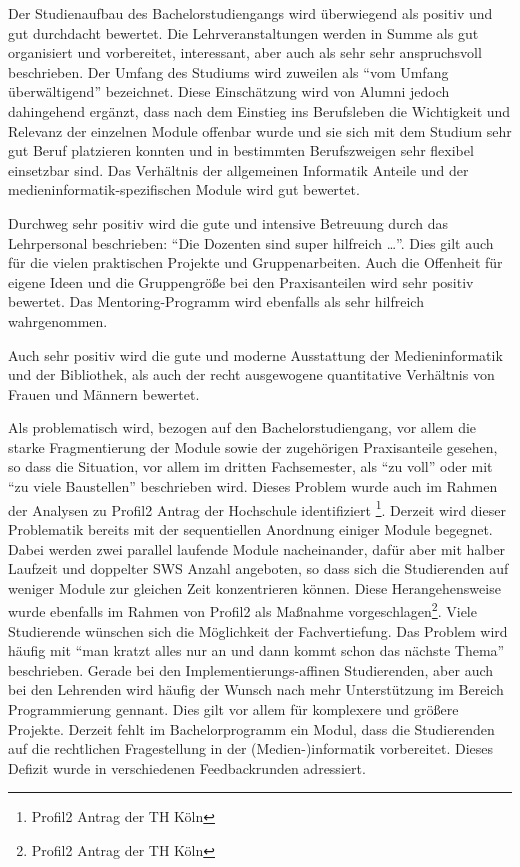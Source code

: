 Der Studienaufbau des Bachelorstudiengangs wird überwiegend als positiv
und gut durchdacht bewertet. Die Lehrveranstaltungen werden in Summe als
gut organisiert und vorbereitet, interessant, aber auch als sehr sehr
anspruchsvoll beschrieben. Der Umfang des Studiums wird zuweilen als
``vom Umfang überwältigend'' bezeichnet. Diese Einschätzung wird von
Alumni jedoch dahingehend ergänzt, dass nach dem Einstieg ins
Berufsleben die Wichtigkeit und Relevanz der einzelnen Module offenbar
wurde und sie sich mit dem Studium sehr gut Beruf platzieren konnten und
in bestimmten Berufszweigen sehr flexibel einsetzbar sind. Das
Verhältnis der allgemeinen Informatik Anteile und der
medieninformatik-spezifischen Module wird gut bewertet.

Durchweg sehr positiv wird die gute und intensive Betreuung durch das
Lehrpersonal beschrieben: ``Die Dozenten sind super hilfreich
\ldots{}''. Dies gilt auch für die vielen praktischen Projekte und
Gruppenarbeiten. Auch die Offenheit für eigene Ideen und die
Gruppengröße bei den Praxisanteilen wird sehr positiv bewertet. Das
Mentoring-Programm wird ebenfalls als sehr hilfreich wahrgenommen.

Auch sehr positiv wird die gute und moderne Ausstattung der
Medieninformatik und der Bibliothek, als auch der recht ausgewogene
quantitative Verhältnis von Frauen und Männern bewertet.

Als problematisch wird, bezogen auf den Bachelorstudiengang, vor allem
die starke Fragmentierung der Module sowie der zugehörigen Praxisanteile
gesehen, so dass die Situation, vor allem im dritten Fachsemester, als
``zu voll'' oder mit ``zu viele Baustellen'' beschrieben wird. Dieses
Problem wurde auch im Rahmen der Analysen zu Profil2 Antrag der
Hochschule identifiziert \footnote{Profil2 Antrag der TH Köln}. Derzeit
wird dieser Problematik bereits mit der sequentiellen Anordnung einiger
Module begegnet. Dabei werden zwei parallel laufende Module
nacheinander, dafür aber mit halber Laufzeit und doppelter SWS Anzahl
angeboten, so dass sich die Studierenden auf weniger Module zur gleichen
Zeit konzentrieren können. Diese Herangehensweise wurde ebenfalls im
Rahmen von Profil2 als Maßnahme vorgeschlagen\footnote{Profil2 Antrag
  der TH Köln}. Viele Studierende wünschen sich die Möglichkeit der
Fachvertiefung. Das Problem wird häufig mit ``man kratzt alles nur an
und dann kommt schon das nächste Thema'' beschrieben. Gerade bei den
Implementierungs-affinen Studierenden, aber auch bei den Lehrenden wird
häufig der Wunsch nach mehr Unterstützung im Bereich Programmierung
gennant. Dies gilt vor allem für komplexere und größere Projekte.
Derzeit fehlt im Bachelorprogramm ein Modul, dass die Studierenden auf
die rechtlichen Fragestellung in der (Medien-)informatik vorbereitet.
Dieses Defizit wurde in verschiedenen Feedbackrunden adressiert.

